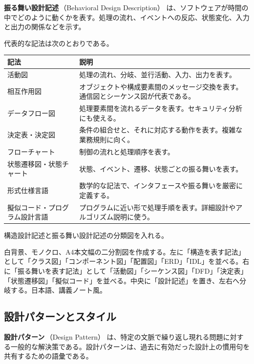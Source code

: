 \documentclass[10.5pt,a4paper]{ltjsarticle}
\newcommand{\term}[2]{\textbf{#1}\,（#2）}
\begin{document}
\term{振る舞い設計記述}{Behavioral Design Description} は、ソフトウェアが時間の中でどのように動くかを表す。処理の流れ、イベントへの反応、状態変化、入力と出力の関係などを示す。

代表的な記法は次のとおりである。

\begin{longtable}{L{42mm}L{112mm}}
\toprule
\textbf{記法} & \textbf{説明} \\
\midrule
\endhead
活動図 & 処理の流れ、分岐、並行活動、入力、出力を表す。 \\
相互作用図 & オブジェクトや構成要素間のメッセージ交換を表す。通信図とシーケンス図が代表である。 \\
データフロー図 & 処理要素間を流れるデータを表す。セキュリティ分析にも使える。 \\
決定表・決定図 & 条件の組合せと、それに対応する動作を表す。複雑な業務規則に向く。 \\
フローチャート & 制御の流れと処理順序を表す。 \\
状態遷移図・状態チャート & 状態、イベント、遷移、状態ごとの振る舞いを表す。 \\
形式仕様言語 & 数学的な記法で、インタフェースや振る舞いを厳密に定義する。 \\
擬似コード・プログラム設計言語 & プログラムに近い形で処理手順を表す。詳細設計やアルゴリズム説明に使う。 \\
\bottomrule
\end{longtable}

\begin{todobox}
構造設計記述と振る舞い設計記述の分類図を入れる。
\end{todobox}
\begin{promptbox}
白背景、モノクロ、A4本文幅の二分割図を作成する。左に「構造を表す記法」として「クラス図」「コンポーネント図」「配置図」「ERD」「IDL」を並べる。右に「振る舞いを表す記法」として「活動図」「シーケンス図」「DFD」「決定表」「状態遷移図」「擬似コード」を並べる。中央に「設計記述」を置き、左右へ分岐する。日本語、講義ノート風。
\end{promptbox}

\subsection{設計パターンとスタイル}

\term{設計パターン}{Design Pattern} は、特定の文脈で繰り返し現れる問題に対する一般的な解決策である。設計パターンは、過去に有効だった設計上の慣用句を共有するための語彙である。
\end{document}
